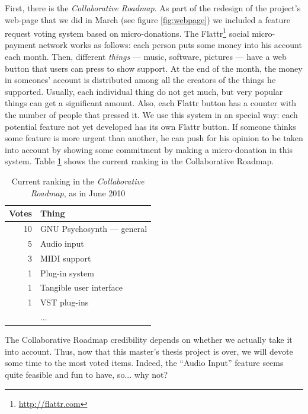 First, there is the \emph{Collaborative Roadmap}. As part of the
redesign of the project's web-page that we did in March (see figure
\ref{fig:webpage}) we included a feature request voting system based
on micro-donations. The Flattr\footnote{\url{http://flattr.com}}
social micro-payment network works as follows: each person puts some
money into his account each month. Then, different \emph{things} ---
music, software, pictures --- have a web button that users can press
to show support. At the end of the month, the money in someones'
account is distributed among all the creators of the things he
supported. Usually, each individual thing do not get much, but very
popular things can get a significant amount. Also, each Flattr button
has a counter with the number of people that pressed it. We use this
system in an special way: each potential feature not yet developed has
its own Flattr button. If someone thinks some feature is more urgent
than another, he can push for his opinion to be taken into account by
showing some commitment by making a micro-donation in this
system. Table \ref{tab:flattr} shows the current ranking in the
Collaborative Roadmap.

\begin{table}[h]
  \centering
  \begin{tabular}{r|l}
    Votes & Thing \\ \hline
    10 & GNU Psychosynth --- general \\
    5 & Audio input \\
    3 & MIDI support \\
    1 & Plug-in system \\
    1 & Tangible user interface \\
    1 & VST plug-ins \\
    & ...
  \end{tabular}
  \caption{Current ranking in the \emph{Collaborative Roadmap}, as in June 2010}
  \label{tab:flattr}
\end{table}

The Collaborative Roadmap credibility depends on whether we actually
take it into account. Thus, now that this master's thesis project is
over, we will devote some time to the most voted items. Indeed, the
``Audio Input'' feature seems quite feasible and fun to have,
so... why not?

